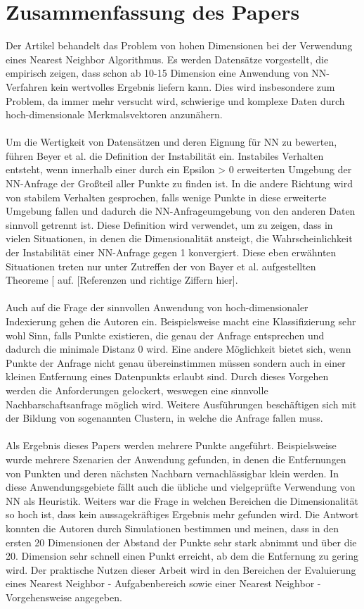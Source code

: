 \documentclass{article}
\begin{document}
\section{Zusammenfassung des Papers}
Der Artikel behandelt das Problem von hohen Dimensionen bei der Verwendung eines Nearest Neighbor Algorithmus. Es werden Datensätze vorgestellt, die empirisch zeigen, dass schon ab 10-15 Dimension eine Anwendung von NN-Verfahren kein wertvolles Ergebnis liefern kann. Dies wird insbesondere zum Problem, da immer mehr versucht wird, schwierige und komplexe Daten durch hoch-dimensionale Merkmalsvektoren anzunähern.  
\\
\\
Um die Wertigkeit von Datensätzen und deren Eignung für NN zu bewerten, führen Beyer et al. die Definition der Instabilität ein. Instabiles Verhalten entsteht, wenn innerhalb einer durch ein Epsilon > 0 erweiterten Umgebung der NN-Anfrage der Großteil aller Punkte zu finden ist. In die andere Richtung wird von stabilem Verhalten gesprochen, falls wenige Punkte in diese erweiterte Umgebung fallen und dadurch die NN-Anfrageumgebung von den anderen Daten sinnvoll getrennt ist. 
Diese Definition wird verwendet, um zu zeigen, dass in vielen Situationen, in denen die Dimensionalität ansteigt, die Wahrscheinlichkeit der Instabilität einer NN-Anfrage gegen 1 konvergiert. Diese eben erwähnten Situationen treten nur unter Zutreffen der von Bayer et al. aufgestellten Theoreme [ auf. [Referenzen und richtige Ziffern hier].
\\
\\
Auch auf die Frage der sinnvollen Anwendung von hoch-dimensionaler Indexierung gehen die Autoren ein. Beispielsweise macht eine Klassifizierung sehr wohl Sinn, falls Punkte existieren, die genau der Anfrage entsprechen und dadurch die minimale Distanz 0 wird. Eine andere Möglichkeit bietet sich, wenn Punkte der Anfrage nicht genau übereinstimmen müssen sondern auch in einer kleinen Entfernung eines Datenpunkts erlaubt sind. Durch dieses Vorgehen werden die Anforderungen gelockert, weswegen eine sinnvolle Nachbarschaftsanfrage möglich wird. Weitere Ausführungen beschäftigen sich mit der Bildung von sogenannten Clustern, in welche die Anfrage fallen muss.
\\
\\
Als Ergebnis dieses Papers werden mehrere Punkte angeführt. Beispielsweise wurde mehrere Szenarien der Anwendung gefunden, in denen die Entfernungen von Punkten und deren nächsten Nachbarn vernachlässigbar klein werden. In diese Anwendungsgebiete fällt auch die übliche und vielgeprüfte Verwendung von NN als Heuristik. 
Weiters war die Frage in welchen Bereichen die Dimensionalität so hoch ist, dass kein aussagekräftiges Ergebnis mehr gefunden wird. Die Antwort konnten die Autoren durch Simulationen bestimmen und meinen, dass in den ersten 20 Dimensionen der Abstand der Punkte sehr stark abnimmt und über die 20. Dimension sehr schnell einen Punkt erreicht, ab dem die Entfernung zu gering wird. 
Der praktische Nutzen dieser Arbeit wird in den Bereichen der Evaluierung eines Nearest Neighbor - Aufgabenbereich sowie einer Nearest Neighbor - Vorgehensweise angegeben. 
\end{document}
